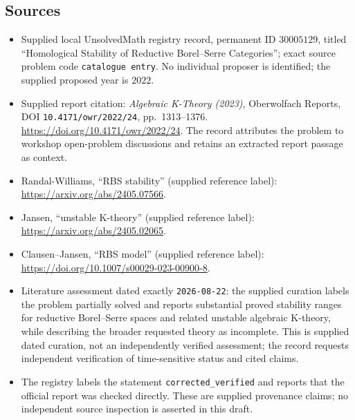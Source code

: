 \documentclass[11pt]{article}
\begin{document}
\subsection{Sources}
\begin{itemize}
\item Supplied local UnsolvedMath registry record, permanent ID \(30005129\), titled ``Homological Stability of Reductive Borel--Serre Categories''; exact source problem code \texttt{catalogue entry}. No individual proposer is identified; the supplied proposed year is \(2022\).
\item Supplied report citation: \emph{Algebraic K-Theory (2023)}, Oberwolfach Reports, DOI \texttt{10.4171/owr/2022/24}, pp.\ 1313--1376. \url{https://doi.org/10.4171/owr/2022/24}. The record attributes the problem to workshop open-problem discussions and retains an extracted report passage as context.
\item Randal-Williams, ``RBS stability'' (supplied reference label): \url{https://arxiv.org/abs/2405.07566}.
\item Jansen, ``unstable K-theory'' (supplied reference label): \url{https://arxiv.org/abs/2405.02065}.
\item Clausen--Jansen, ``RBS model'' (supplied reference label): \url{https://doi.org/10.1007/s00029-023-00900-8}.
\item Literature assessment dated exactly \texttt{2026-08-22}: the supplied curation labels the problem partially solved and reports substantial proved stability ranges for reductive Borel--Serre spaces and related unstable algebraic K-theory, while describing the broader requested theory as incomplete. This is supplied dated curation, not an independently verified assessment; the record requests independent verification of time-sensitive status and cited claims.
\item The registry labels the statement \texttt{corrected\_verified} and reports that the official report was checked directly. These are supplied provenance claims; no independent source inspection is asserted in this draft.
\end{itemize}
\end{document}
